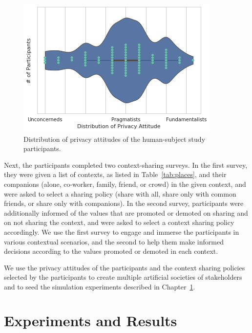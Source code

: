  
 \begin{figure}
     \centering
     \includegraphics[width=0.6\columnwidth]{./Chapter-5/fig/privacy-attitude-distribution.png}
     \caption[Distribution of privacy attitudes]{Distribution of privacy attitudes of the human-subject study participants. }
     \label{fig:participants-privacy-distribution}
 \end{figure}

Next, the participants completed two context-sharing surveys. 
In the first survey, they were given a list of contexts, as listed in Table~\ref{tab:places}, and their companions (alone, co-worker, family, friend, or crowd) in the given context, and were asked to select a sharing policy (share with all, share only with common friends, or share only with companions). In the second survey, participants were additionally informed of the values that are promoted or demoted on sharing and on not sharing the context, and were asked to select a context sharing policy accordingly. We use the first survey to engage and immerse the participants in various contextual scenarios, and the second to help them make informed decisions according to the values promoted or demoted in each context.

We use the privacy attitudes of the participants and the context sharing policies selected by the participants to create multiple artificial societies of stakeholders and to seed the simulation experiments described in Chapter~\ref{sec:results}. 

\section{Experiments and Results}
\label{sec:results}

